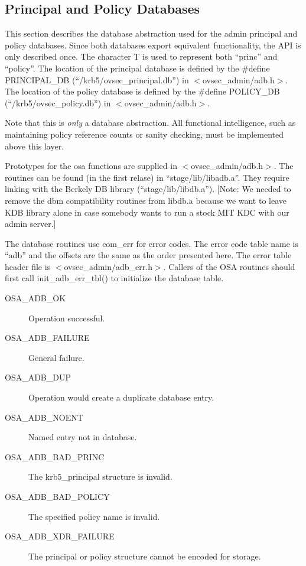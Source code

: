 \subsection{Principal and Policy Databases}

This section describes the database abstraction used for the admin
principal and policy databases.  Since both databases export
equivalent functionality, the API is only described once.  The
character T is used to represent both ``princ'' and ``policy''. The
location of the principal database is defined by the \#define
PRINCIPAL_DB (``/krb5/ovsec_principal.db'') in $<$ovsec_admin/adb.h$>$. The
location of the policy database is defined by the \#define POLICY_DB
(``/krb5/ovsec_policy.db'') in $<$ovsec_admin/adb.h$>$.

Note that this is {\it only} a database abstraction.  All functional
intelligence, such as maintaining policy reference counts or sanity
checking, must be implemented above this layer.

Prototypes for the osa functions are supplied in
$<$ovsec_admin/adb.h$>$. The routines can be found (in the first
relase) in ``stage/lib/libadb.a''. They require linking with the
Berkely DB library (``stage/lib/libdb.a''). [Note: We needed to remove
the dbm compatibility routines from libdb.a because we want to leave
KDB library alone in case somebody wants to run a stock MIT KDC with
our admin server.]

The database routines use com_err for error codes.  The error code
table name is ``adb'' and the offsets are the same as the order
presented here. The error table header file is
$<$ovsec_admin/adb_err.h$>$. Callers of the OSA routines should first call
init_adb_err_tbl() to initialize the database table.

\begin{description}
\item[OSA_ADB_OK] Operation successful.
\item[OSA_ADB_FAILURE] General failure.
\item[OSA_ADB_DUP] Operation would create a duplicate database entry.
\item[OSA_ADB_NOENT] Named entry not in database.
\item[OSA_ADB_BAD_PRINC] The krb5_principal structure is invalid.
\item[OSA_ADB_BAD_POLICY] The specified policy name is invalid.
\item[OSA_ADB_XDR_FAILURE] The principal or policy structure cannot be
encoded for storage.
\end{description}

